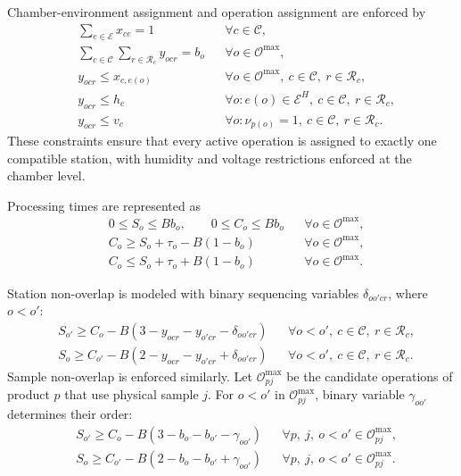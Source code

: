 \documentclass[11pt]{article}
\begin{document}
Chamber-environment assignment and operation assignment are enforced by
\begin{align}
& \sum_{e\in\mathcal{E}}x_{ce}=1 && \forall c\in\mathcal{C},\\
& \sum_{c\in\mathcal{C}}\sum_{r\in\mathcal{R}_c}y_{ocr}=b_o && \forall o\in\mathcal{O}^{\max},\\
& y_{ocr}\le x_{c,e(o)} && \forall o\in\mathcal{O}^{\max},\ c\in\mathcal{C},\ r\in\mathcal{R}_c,\\
& y_{ocr}\le h_c && \forall o:e(o)\in\mathcal{E}^{H},\ c\in\mathcal{C},\ r\in\mathcal{R}_c,\\
& y_{ocr}\le v_c && \forall o:\nu_{p(o)}=1,\ c\in\mathcal{C},\ r\in\mathcal{R}_c.
\end{align}
These constraints ensure that every active operation is assigned to exactly one compatible station, with humidity and voltage restrictions enforced at the chamber level.

Processing times are represented as
\begin{align}
& 0\le S_o\le Bb_o,\qquad 0\le C_o\le Bb_o && \forall o\in\mathcal{O}^{\max},\\
& C_o\ge S_o+\tau_o-B(1-b_o) && \forall o\in\mathcal{O}^{\max},\\
& C_o\le S_o+\tau_o+B(1-b_o) && \forall o\in\mathcal{O}^{\max}.
\end{align}

Station non-overlap is modeled with binary sequencing variables \(\delta_{oo'cr}\), where \(o<o'\):
\begin{align}
& S_{o'}\ge C_o-B(3-y_{ocr}-y_{o'cr}-\delta_{oo'cr})
&& \forall o<o',\ c\in\mathcal{C},\ r\in\mathcal{R}_c,\\
& S_o\ge C_{o'}-B(2-y_{ocr}-y_{o'cr}+\delta_{oo'cr})
&& \forall o<o',\ c\in\mathcal{C},\ r\in\mathcal{R}_c.
\end{align}
Sample non-overlap is enforced similarly. Let \(\mathcal{O}^{\max}_{pj}\) be the candidate operations of product \(p\) that use physical sample \(j\). For \(o<o'\) in \(\mathcal{O}^{\max}_{pj}\), binary variable \(\gamma_{oo'}\) determines their order:
\begin{align}
& S_{o'}\ge C_o-B(3-b_o-b_{o'}-\gamma_{oo'})
&& \forall p,\ j,\ o<o'\in\mathcal{O}^{\max}_{pj},\\
& S_o\ge C_{o'}-B(2-b_o-b_{o'}+\gamma_{oo'})
&& \forall p,\ j,\ o<o'\in\mathcal{O}^{\max}_{pj}.
\end{align}
\end{document}
